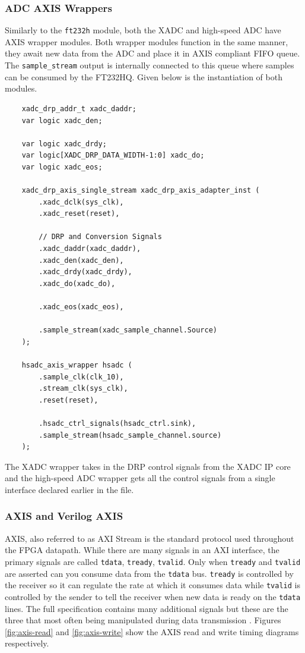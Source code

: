 \documentclass[letterpaper,11pt]{article}
\newcommand{\code}[1]{\texttt{#1}}
\begin{document}
\subsubsection{ADC AXIS Wrappers}
Similarly to the \code{ft232h} module, both the XADC and high-speed ADC have
AXIS wrapper modules. Both wrapper modules function in the same manner, they
await new data from the ADC and place it in AXIS compliant FIFO queue. The
\code{sample_stream} output is internally connected to this queue where samples
can be consumed by the FT232HQ. Given below is the instantiation of both
modules.
\begin{verbatim}
    xadc_drp_addr_t xadc_daddr;
    var logic xadc_den;

    var logic xadc_drdy;
    var logic[XADC_DRP_DATA_WIDTH-1:0] xadc_do;
    var logic xadc_eos;

    xadc_drp_axis_single_stream xadc_drp_axis_adapter_inst (
        .xadc_dclk(sys_clk),
        .xadc_reset(reset),

        // DRP and Conversion Signals
        .xadc_daddr(xadc_daddr),
        .xadc_den(xadc_den),
        .xadc_drdy(xadc_drdy),
        .xadc_do(xadc_do),

        .xadc_eos(xadc_eos),

        .sample_stream(xadc_sample_channel.Source)
    );

    hsadc_axis_wrapper hsadc (
        .sample_clk(clk_10),
        .stream_clk(sys_clk),
        .reset(reset),

        .hsadc_ctrl_signals(hsadc_ctrl.sink),
        .sample_stream(hsadc_sample_channel.source)
    );

\end{verbatim}

The XADC wrapper takes in the DRP control signals from the XADC IP core and the
high-speed ADC wrapper gets all the control signals from a single interface
declared earlier in the file.


\subsubsection{AXIS and Verilog AXIS} \label{sec:external-fpga-libs} AXIS, also
referred to as AXI Stream is the standard protocol used throughout the FPGA
datapath. While there are many signals in an AXI interface, the primary signals
are called \code{tdata}, \code{tready}, \code{tvalid}. Only when \code{tready}
and \code{tvalid} are asserted can you consume data from the \code{tdata} bus.
\code{tready} is controlled by the receiver so it can regulate the rate at which
it consumes data while \code{tvalid} is controlled by the sender to tell the
receiver when new data is ready on the \code{tdata} lines. The full
specification contains many additional signals but these are the three that most
often being manipulated during data transmission \cite{axis_spec}. Figures
\ref{fig:axis-read} and \ref{fig:axis-write} show the AXIS read and write timing
diagrams respectively.
\end{document}
